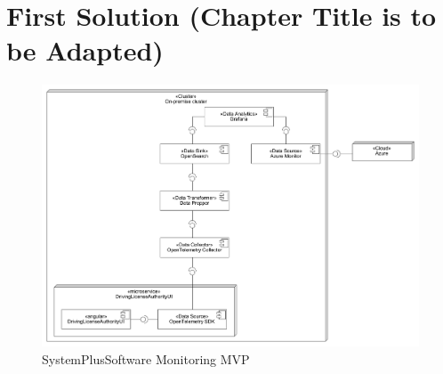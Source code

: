 \chapter{First Solution (Chapter Title is to be Adapted)}



\begin{figure}[h]
	\centering
	\includegraphics[width=\textwidth]{figures/sps_monitoring_mvp.png}
	\caption{SystemPlusSoftware Monitoring MVP}
	\label{fig:sps_monitoring_mvp}
\end{figure}